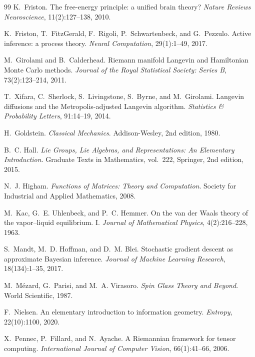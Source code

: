\documentclass[11pt]{article}
\theoremstyle{plain}
\theoremstyle{definition}
\begin{document}
\begin{thebibliography}{99}
K.~Friston.
\newblock The free-energy principle: a unified brain theory?
\newblock \emph{Nature Reviews Neuroscience}, 11(2):127--138, 2010.

K.~Friston, T.~FitzGerald, F.~Rigoli, P.~Schwartenbeck, and G.~Pezzulo.
\newblock Active inference: a process theory.
\newblock \emph{Neural Computation}, 29(1):1--49, 2017.

M.~Girolami and B.~Calderhead.
\newblock Riemann manifold Langevin and Hamiltonian Monte Carlo methods.
\newblock \emph{Journal of the Royal Statistical Society: Series B}, 73(2):123--214, 2011.

T.~Xifara, C.~Sherlock, S.~Livingstone, S.~Byrne, and M.~Girolami.
\newblock Langevin diffusions and the Metropolis-adjusted Langevin algorithm.
\newblock \emph{Statistics \& Probability Letters}, 91:14--19, 2014.

H.~Goldstein.
\newblock \emph{Classical Mechanics}.
\newblock Addison-Wesley, 2nd edition, 1980.

B.~C. Hall.
\newblock \emph{Lie Groups, Lie Algebras, and Representations: An Elementary Introduction}.
\newblock Graduate Texts in Mathematics, vol.~222, Springer, 2nd edition, 2015.

N.~J. Higham.
\newblock \emph{Functions of Matrices: Theory and Computation}.
\newblock Society for Industrial and Applied Mathematics, 2008.

M.~Kac, G.~E. Uhlenbeck, and P.~C. Hemmer.
\newblock On the van der Waals theory of the vapor--liquid equilibrium. I.
\newblock \emph{Journal of Mathematical Physics}, 4(2):216--228, 1963.

S.~Mandt, M.~D. Hoffman, and D.~M. Blei.
\newblock Stochastic gradient descent as approximate Bayesian inference.
\newblock \emph{Journal of Machine Learning Research}, 18(134):1--35, 2017.

M.~M\'ezard, G.~Parisi, and M.~A. Virasoro.
\newblock \emph{Spin Glass Theory and Beyond}.
\newblock World Scientific, 1987.

F.~Nielsen.
\newblock An elementary introduction to information geometry.
\newblock \emph{Entropy}, 22(10):1100, 2020.

X.~Pennec, P.~Fillard, and N.~Ayache.
\newblock A Riemannian framework for tensor computing.
\newblock \emph{International Journal of Computer Vision}, 66(1):41--66, 2006.


\end{thebibliography}
\end{document}
